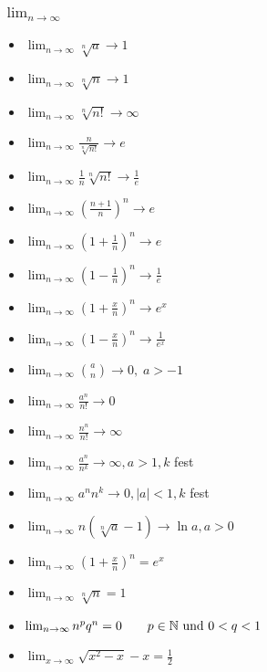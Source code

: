 \subsubsection*{$\lim_{n \to \infty}$}
\begin{itemize}[leftmargin=*]
	\item $\lim_{n \to \infty} \sqrt[n]{a} \rightarrow 1$
	\item $\lim_{n \to \infty} \sqrt[n]{n} \rightarrow 1$
	\item $\lim_{n \to \infty} \sqrt[n]{n!} \rightarrow \infty$
	\item $\lim_{n \to \infty} \frac{n}{\sqrt[n]{n!}} \rightarrow e$
	\item $\lim_{n \to \infty} \frac{1}{n} \sqrt[n]{n!} \rightarrow \frac{1}{e}$
	\item $\lim_{n \to \infty} \left ( \frac{n+1}{n} \right )^n \rightarrow e$
	\item $\lim_{n \to \infty} \left ( 1 + \frac{1}{n} \right )^n \rightarrow e$
	\item $\lim_{n \to \infty} \left ( 1 - \frac{1}{n} \right )^n \rightarrow \frac{1}{e}$
	\item $\lim_{n \to \infty} \left ( 1 + \frac{x}{n} \right )^n \rightarrow e^x$
	\item $\lim_{n \to \infty} \left ( 1 - \frac{x}{n} \right )^n \rightarrow \frac{1}{e^x}$
	\item $\lim_{n \to \infty} {a \choose n} \rightarrow 0, \; a > -1$
	\item $\lim_{n \to \infty} \frac{a^n}{n!} \rightarrow 0$
	\item $\lim_{n \to \infty} \frac{n^n}{n!} \rightarrow \infty$
	\item $\lim_{n \to \infty} \frac{a^n}{n^k} \rightarrow \infty, a > 1, k$ fest
	\item $\lim_{n \to \infty} a^n n^k \rightarrow 0, |a| < 1, k$ fest
	\item $\lim_{n \to \infty} n(\sqrt[n]{a} - 1) \rightarrow \ln a, a > 0$
	\item $\lim_{n \to \infty} \left( 1+\frac{x}{n} \right)^n = e^x \quad$
	\item $\lim_{n \to \infty} \sqrt[n]{n} = 1$
	\item $\lim_{n \to \infty} n^p q^n = 0 \qquad p \in \mathbb{N} \text{ und } 0 < q < 1$
	\item $\lim_{x \to \infty} \sqrt{x^2-x}-x = \frac{1}{2}$ 
\end{itemize}
